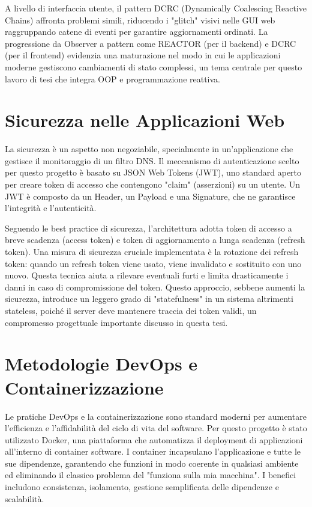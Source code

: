 \documentclass[12pt,a4paper,openright,twoside]{book}
\begin{document}
A livello di interfaccia utente, il pattern DCRC (Dynamically Coalescing Reactive Chains) \cite{Oliveira2024DCRC} affronta problemi simili, riducendo i "glitch" visivi nelle GUI web raggruppando catene di eventi per garantire aggiornamenti ordinati. La progressione da Observer a pattern come REACTOR (per il backend) e DCRC (per il frontend) evidenzia una maturazione nel modo in cui le applicazioni moderne gestiscono cambiamenti di stato complessi, un tema centrale per questo lavoro di tesi che integra OOP e programmazione reattiva.

\section{Sicurezza nelle Applicazioni Web}
\label{sec:sicurezza_web}

La sicurezza è un aspetto non negoziabile, specialmente in un'applicazione che gestisce il monitoraggio di un filtro DNS. Il meccanismo di autenticazione scelto per questo progetto è basato su JSON Web Tokens (JWT), uno standard aperto per creare token di accesso che contengono "claim" (asserzioni) su un utente. Un JWT è composto da un Header, un Payload e una Signature, che ne garantisce l'integrità e l'autenticità.

Seguendo le best practice di sicurezza, l'architettura adotta token di accesso a breve scadenza (access token) e token di aggiornamento a lunga scadenza (refresh token). Una misura di sicurezza cruciale implementata è la rotazione dei refresh token: quando un refresh token viene usato, viene invalidato e sostituito con uno nuovo. Questa tecnica aiuta a rilevare eventuali furti e limita drasticamente i danni in caso di compromissione del token. Questo approccio, sebbene aumenti la sicurezza, introduce un leggero grado di "statefulness" in un sistema altrimenti stateless, poiché il server deve mantenere traccia dei token validi, un compromesso progettuale importante discusso in questa tesi.

\section{Metodologie DevOps e Containerizzazione}
\label{sec:devops}

Le pratiche DevOps e la containerizzazione sono standard moderni per aumentare l'efficienza e l'affidabilità del ciclo di vita del software. Per questo progetto è stato utilizzato Docker, una piattaforma che automatizza il deployment di applicazioni all'interno di container software. I container incapsulano l'applicazione e tutte le sue dipendenze, garantendo che funzioni in modo coerente in qualsiasi ambiente ed eliminando il classico problema del "funziona sulla mia macchina". I benefici includono consistenza, isolamento, gestione semplificata delle dipendenze e scalabilità.
\end{document}
